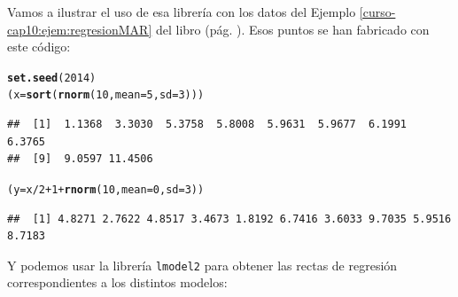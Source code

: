 \documentclass[10pt,a4paper]{article}\usepackage[]{graphicx}\usepackage[]{color}
\makeatletter
\newcommand{\hlnum}[1]{\textcolor[rgb]{0.686,0.059,0.569}{#1}}%
\newcommand{\hlopt}[1]{\textcolor[rgb]{0,0,0}{#1}}%
\newcommand{\hlstd}[1]{\textcolor[rgb]{0.345,0.345,0.345}{#1}}%
\newcommand{\hlkwb}[1]{\textcolor[rgb]{0.69,0.353,0.396}{#1}}%
\newcommand{\hlkwc}[1]{\textcolor[rgb]{0.333,0.667,0.333}{#1}}%
\newcommand{\hlkwd}[1]{\textcolor[rgb]{0.737,0.353,0.396}{\textbf{#1}}}%
\newenvironment{kframe}{%
 \def\at@end@of@kframe{}%
 \ifinner\ifhmode%
  \def\at@end@of@kframe{\end{minipage}}%
  \begin{minipage}{\columnwidth}%
 \fi\fi%
 \def\FrameCommand##1{\hskip\@totalleftmargin \hskip-\fboxsep
 \colorbox{shadecolor}{##1}\hskip-\fboxsep
     \hskip-\linewidth \hskip-\@totalleftmargin \hskip\columnwidth}%
 \MakeFramed {\advance\hsize-\width
   \@totalleftmargin\z@ \linewidth\hsize
   \@setminipage}}%
 {\par\unskip\endMakeFramed%
 \at@end@of@kframe}
\newenvironment{knitrout}{}{} %
\makeatother
\begin{document}
Vamos a ilustrar el uso de esa librería con los datos del Ejemplo \ref{curso-cap10:ejem:regresionMAR} del libro (pág. \pageref{curso-cap10:ejem:regresionMAR}). Esos puntos se han fabricado con este código:
\begin{knitrout}
\color{fgcolor}\begin{kframe}
\begin{alltt}
\hlkwd{set.seed}\hlstd{(}\hlnum{2014}\hlstd{)}
\hlstd{(x} \hlkwb{=} \hlkwd{sort}\hlstd{(}\hlkwd{rnorm}\hlstd{(}\hlnum{10}\hlstd{,} \hlkwc{mean}\hlstd{=}\hlnum{5}\hlstd{,} \hlkwc{sd}\hlstd{=}\hlnum{3}\hlstd{)))}
\end{alltt}
\begin{verbatim}
##  [1]  1.1368  3.3030  5.3758  5.8008  5.9631  5.9677  6.1991  6.3765
##  [9]  9.0597 11.4506
\end{verbatim}
\begin{alltt}
\hlstd{(y} \hlkwb{=} \hlstd{x}\hlopt{/}\hlnum{2} \hlopt{+} \hlnum{1} \hlopt{+} \hlkwd{rnorm}\hlstd{(}\hlnum{10}\hlstd{,} \hlkwc{mean}\hlstd{=}\hlnum{0}\hlstd{,} \hlkwc{sd}\hlstd{=}\hlnum{3}\hlstd{))}
\end{alltt}
\begin{verbatim}
##  [1] 4.8271 2.7622 4.8517 3.4673 1.8192 6.7416 3.6033 9.7035 5.9516 8.7183
\end{verbatim}
\end{kframe}
\end{knitrout}
Y podemos usar la librería {\tt lmodel2} para obtener las rectas de regresión correspondientes a los distintos modelos:
\end{document}
